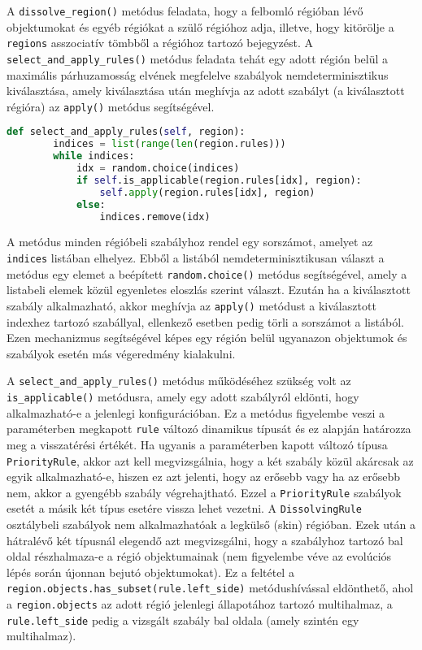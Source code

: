 A \verb|dissolve_region()| metódus feladata, hogy a felbomló régióban lévő objektumokat és egyéb régiókat a szülő régióhoz adja, illetve, hogy kitörölje a \verb|regions| asszociatív tömbből a régióhoz tartozó bejegyzést.
A \verb|select_and_apply_rules()| metódus feladata tehát egy adott régión belül a maximális párhuzamosság elvének megfelelve szabályok nemdeterminisztikus kiválasztása, amely kiválasztása után meghívja az adott szabályt (a kiválasztott régióra) az \verb|apply()| metódus segítségével.

\begin{lstlisting}[language={Python}]
 def select_and_apply_rules(self, region):
        indices = list(range(len(region.rules)))
        while indices:
            idx = random.choice(indices)
            if self.is_applicable(region.rules[idx], region):
                self.apply(region.rules[idx], region)
            else:
                indices.remove(idx)	
\end{lstlisting}

A metódus minden régióbeli szabályhoz rendel egy sorszámot, amelyet az \verb|indices| listában elhelyez. Ebből a listából nemdeterminisztikusan választ a metódus egy elemet a beépített \verb|random.choice()| metódus segítségével, amely a listabeli elemek közül egyenletes eloszlás szerint választ. Ezután ha a kiválasztott szabály alkalmazható, akkor meghívja az \verb|apply()| metódust a kiválasztott indexhez tartozó szabállyal, ellenkező esetben pedig törli a sorszámot a listából. Ezen mechanizmus segítségével képes egy régión belül ugyanazon objektumok és szabályok esetén más végeredmény kialakulni. 
 
 A \verb|select_and_apply_rules()| metódus működéséhez szükség volt az \verb|is_applicable()| metódusra, amely egy adott szabályról eldönti, hogy alkalmazható-e a jelenlegi konfigurációban.
 Ez a metódus figyelembe veszi a paraméterben megkapott \verb|rule| változó dinamikus típusát és ez alapján határozza meg a visszatérési értékét. Ha ugyanis a paraméterben kapott változó típusa \verb|PriorityRule|, akkor azt kell megvizsgálnia, hogy a két szabály közül akárcsak az egyik alkalmazható-e, hiszen ez azt jelenti, hogy az erősebb vagy ha az erősebb nem, akkor a gyengébb szabály végrehajtható. Ezzel a \verb|PriorityRule| szabályok esetét a másik két típus esetére vissza lehet vezetni. A \verb|DissolvingRule| osztálybeli szabályok nem alkalmazhatóak a legkülső (skin) régióban. Ezek után a hátralévő két típusnál elegendő azt megvizsgálni, hogy a szabályhoz tartozó bal oldal részhalmaza-e a régió objektumainak (nem figyelembe véve az evolúciós lépés során újonnan bejutó objektumokat). 
 Ez a feltétel a \verb|region.objects.has_subset(rule.left_side)| metódushívással eldönthető, ahol a \verb|region.objects| az adott régió jelenlegi állapotához tartozó multihalmaz, a \verb|rule.left_side| pedig a vizsgált szabály bal oldala (amely szintén egy multihalmaz).

